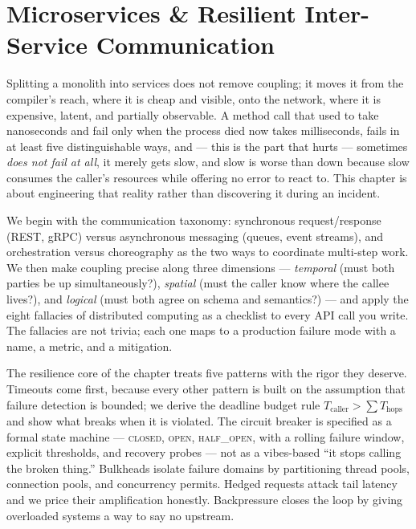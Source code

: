\chapter{Microservices \& Resilient Inter-Service Communication}
\label{ch:microservices}

Splitting a monolith into services does not remove coupling; it moves it
from the compiler's reach, where it is cheap and visible, onto the network,
where it is expensive, latent, and partially observable. A method call that
used to take nanoseconds and fail only when the process died now takes
milliseconds, fails in at least five distinguishable ways, and --- this is
the part that hurts --- sometimes \emph{does not fail at all}, it merely
gets slow, and slow is worse than down because slow consumes the caller's
resources while offering no error to react to. This chapter is about
engineering that reality rather than discovering it during an incident.

We begin with the communication taxonomy: synchronous request/response
(REST, gRPC) versus asynchronous messaging (queues, event streams), and
orchestration versus choreography as the two ways to coordinate multi-step
work. We then make coupling precise along three dimensions ---
\emph{temporal} (must both parties be up simultaneously?), \emph{spatial}
(must the caller know where the callee lives?), and \emph{logical} (must
both agree on schema and semantics?) --- and apply the eight fallacies of
distributed computing as a checklist to every API call you write. The
fallacies are not trivia; each one maps to a production failure mode with a
name, a metric, and a mitigation.

The resilience core of the chapter treats five patterns with the rigor they
deserve. Timeouts come first, because every other pattern is built on the
assumption that failure detection is bounded; we derive the deadline budget
rule $T_{\text{caller}} > \sum T_{\text{hops}}$ and show what breaks when it
is violated. The circuit breaker is specified as a formal state machine ---
\textsc{closed}, \textsc{open}, \textsc{half\_open}, with a rolling failure
window, explicit thresholds, and recovery probes --- not as a vibes-based
``it stops calling the broken thing.'' Bulkheads isolate failure domains by
partitioning thread pools, connection pools, and concurrency permits.
Hedged requests attack tail latency and we price their amplification
honestly. Backpressure closes the loop by giving overloaded systems a way
to say no upstream.

